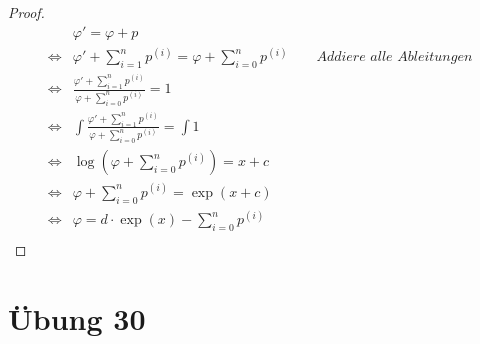 \documentclass[10pt,a4paper]{article}
\begin{document}
\begin{proof}
\begin{align*}
& \varphi' = \varphi + p\\
\Leftrightarrow & \varphi' + \sum_{i = 1}^{n} p^{(i)} = \varphi + \sum_{i = 0}^{n} p^{(i)} \qquad \textit{Addiere alle Ableitungen}\\
\Leftrightarrow & \frac{\varphi' + \sum_{i = 1}^{n} p^{(i)}}{\varphi + \sum_{i = 0}^{n} p^{(i)}} = 1\\
\Leftrightarrow & \int \frac{\varphi' + \sum_{i = 1}^{n} p^{(i)}}{\varphi + \sum_{i = 0}^{n} p^{(i)}} = \int 1\\
\Leftrightarrow & \log(\varphi + \sum_{i = 0}^{n} p^{(i)}) = x + c\\
\Leftrightarrow & \varphi + \sum_{i = 0}^{n} p^{(i)} = \exp(x + c)\\
\Leftrightarrow & \varphi = d \cdot \exp(x) - \sum_{i = 0}^{n} p^{(i)}\\
\end{align*}
\end{proof}

\section*{Übung 30}
\end{document}
